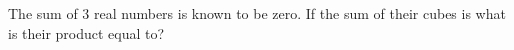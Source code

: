 The sum of $3$ real numbers is known to be zero. If the sum of their cubes is  what is their product equal to?